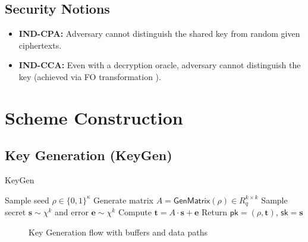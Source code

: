 \documentclass[conference]{IEEEtran}
\begin{document}
\subsection{Security Notions}
\begin{itemize}
    \item \textbf{IND-CPA:} Adversary cannot distinguish the shared key from random given ciphertexts.
    \item \textbf{IND-CCA:} Even with a decryption oracle, adversary cannot distinguish the key (achieved via FO transformation \cite{FO99}).
\end{itemize}

\section{Scheme Construction}
\subsection{Key Generation (KeyGen)}
\begin{algorithm}[H]
\caption{KeyGen}
\begin{algorithmic}[1]
\State Sample seed $\rho \in \{0,1\}^\kappa$
\State Generate matrix $A = \mathsf{GenMatrix}(\rho) \in R_q^{k\times k}$
\State Sample secret $\mathbf{s} \sim \chi^k$ and error $\mathbf{e} \sim \chi^k$
\State Compute $\mathbf{t} = A \cdot \mathbf{s} + \mathbf{e}$
\State Return $\mathsf{pk} = (\rho,\mathbf{t})$, $\mathsf{sk} = \mathbf{s}$
\end{algorithmic}
\end{algorithm}

\begin{figure}[H]
\centering
{}
\caption{Key Generation flow with buffers and data paths}
\end{figure}
\end{document}
